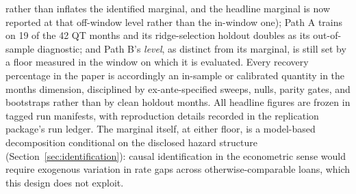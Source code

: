 \documentclass[12pt]{article}
\begin{document}
rather than inflates the identified marginal, and the headline marginal is now reported at that off-window level rather than the in-window one); Path A trains on 19 of the 42 QT months and its ridge-selection holdout doubles as its out-of-sample diagnostic; and Path B's \emph{level}, as distinct from its marginal, is still set by a floor measured in the window on which it is evaluated. Every recovery percentage in the paper is accordingly an in-sample or calibrated quantity in the months dimension, disciplined by ex-ante-specified sweeps, nulls, parity gates, and bootstraps rather than by clean holdout months. All headline figures are frozen in tagged run manifests, with reproduction details recorded in the replication package's run ledger. The marginal itself, at either floor, is a model-based decomposition conditional on the disclosed hazard structure (Section~\ref{sec:identification}): causal identification in the econometric sense would require exogenous variation in rate gaps across otherwise-comparable loans, which this design does not exploit.
\end{document}
